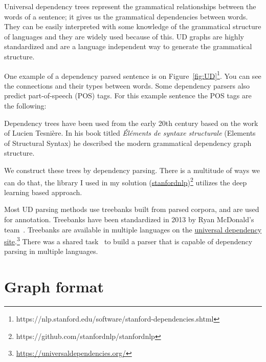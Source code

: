 Universal dependency trees represent the grammatical relationships between the words of a sentence; it gives us the grammatical dependencies between words. They can be easily interpreted with some knowledge of the grammatical structure of languages and they are widely used because of this. UD graphs are highly standardized and are a language independent way to generate the grammatical structure.

One example of a dependency parsed sentence is on Figure~\ref{fig:UD}\footnote{https://nlp.stanford.edu/software/stanford-dependencies.shtml}. You can see the connections and their types between words. Some dependency parsers also predict part-of-speech (POS) tags. For this example sentence the POS tags are the following:

Dependency trees have been used from the early 20th century based on the work of Lucien Tesni\`ere. In his book titled \textit{\'El\'ements de syntaxe structurale} (Elements of Structural Syntax)\cite{UD} he described the modern grammatical dependency graph structure.

We construct these trees by dependency parsing. There is a multitude of ways we can do that, the library I used in my solution (\href{https://github.com/stanfordnlp/stanfordnlp}{stanfordnlp})\footnote{https://github.com/stanfordnlp/stanfordnlp} utilizes the deep learning based approach.

Most UD parsing methods use treebanks built from parsed corpora, and are used for annotation. Treebanks have been standardized in 2013 by Ryan McDonald's team~\cite{TextRank}. Treebanks are available in multiple languages on the \href{https://universaldependencies.org/}{universal dependency site}.\footnote{\url{https://universaldependencies.org/}} There was a shared task~\cite{ParserSharedTask} to build a parser that is capable of dependency parsing in multiple languages.

\section{Graph format}

